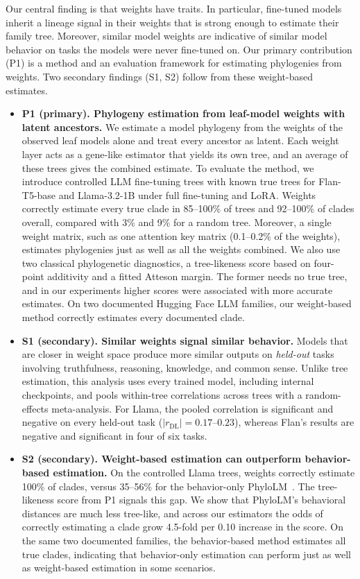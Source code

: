 \documentclass{article}
\theoremstyle{definition}
\theoremstyle{plain}
\begin{document}
Our central finding is that weights have traits. In particular, fine-tuned models inherit a lineage signal in their weights that is strong enough to estimate their family tree. Moreover, similar model weights are indicative of similar model behavior on tasks the models were never fine-tuned on. Our primary contribution (P1) is a method and an evaluation framework for estimating phylogenies from weights. Two secondary findings (S1, S2) follow from these weight-based estimates.
\begin{itemize}[leftmargin=1.3em,itemsep=1pt,topsep=2pt,parsep=0pt]
  \item \textbf{P1 (primary). Phylogeny estimation from leaf-model weights with latent ancestors.} We estimate a model phylogeny from the weights of the observed leaf models alone and treat every ancestor as latent. Each weight layer acts as a gene-like estimator that yields its own tree, and an average of these trees gives the combined estimate. To evaluate the method, we introduce controlled LLM fine-tuning trees with known true trees for Flan-T5-base and Llama-3.2-1B under full fine-tuning and LoRA. Weights correctly estimate every true clade in 85--100\% of trees and 92--100\% of clades overall, compared with 3\% and 9\% for a random tree. Moreover, a single weight matrix, such as one attention key matrix (0.1--0.2\% of the weights), estimates phylogenies just as well as all the weights combined. We also use two classical phylogenetic diagnostics, a tree-likeness score based on four-point additivity and a fitted Atteson margin. The former needs no true tree, and in our experiments higher scores were associated with more accurate estimates. On two documented Hugging Face LLM families, our weight-based method correctly estimates every documented clade.
  \item \textbf{S1 (secondary). Similar weights signal similar behavior.} Models that are closer in weight space produce more similar outputs on \textit{held-out} tasks involving truthfulness, reasoning, knowledge, and common sense. Unlike tree estimation, this analysis uses every trained model, including internal checkpoints, and pools within-tree correlations across trees with a random-effects meta-analysis. For Llama, the pooled correlation is significant and negative on every held-out task ($|r_{\mathrm{DL}}|=0.17$--$0.23$), whereas Flan's results are negative and significant in four of six tasks.
  \item \textbf{S2 (secondary). Weight-based estimation can outperform behavior-based estimation.} On the controlled Llama trees, weights correctly estimate 100\% of clades, versus 35--56\% for the behavior-only PhyloLM~\citep{yax2025phylolm}. The tree-likeness score from P1 signals this gap. We show that PhyloLM's behavioral distances are much less tree-like, and across our estimators the odds of correctly estimating a clade grow 4.5-fold per 0.10 increase in the score. On the same two documented families, the behavior-based method estimates all true clades, indicating that behavior-only estimation can perform just as well as weight-based estimation in some scenarios.
\end{itemize}
\end{document}
